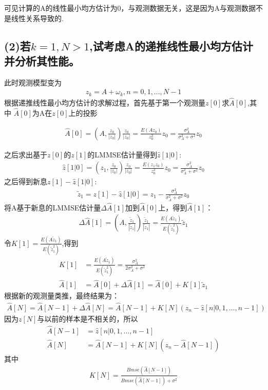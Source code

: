 \documentclass[fontset=windows]{article}
\numberwithin{figure}{section}
\begin{document}
可见计算的A的线性最小均方估计为0，与观测数据无关，这是因为A与观测数据不是线性关系导致的.

\subsection*{(2)若\(k=1,N>1\),试考虑A的递推线性最小均方估计并分析其性能。}

此时观测模型变为
\begin{align*}
	z_k=A+\omega_k,n=0,1,\dots,N-1
\end{align*}
根据递推线性最小均方估计的求解过程，首先基于第一个观测量\(z[0]\)求\(\hat{A}[0]\),其中
\(\hat{A}[0]\)为A在\(z[0]\)上的投影

\begin{align*}
	\hat{A}[0]=\left( A,\frac{z_0}{|z_0|}\right)\frac{z_0}{|z_0|}=\frac{E(Az_0)}{z_0^2}z_0
	=\frac{\sigma_A^2}{\sigma_A^2+\sigma^2}z_0
\end{align*}

之后求出基于\(z[0]\)的\(z[1]\)的LMMSE估计量得到\(\hat{z}[1|0]\):
\begin{align*}
	\hat{z}[1|0]=\left( z_1,\frac{z_0}{|z_0|}\right)\frac{z_0}{|z_0|}=\frac{E(z_1 z_0)}{z_0^2}z_0
	=\frac{\sigma_A^2}{\sigma_A^2+\sigma^2}z_0
\end{align*}
之后得到新息\(z[1]-\hat{z}[1|0]\):
\begin{align*}
	\widetilde{z}_1=z[1]-\hat{z}[1|0]=z_1-\frac{\sigma_A^2}{\sigma_A^2+\sigma^2}z_0
\end{align*}
将A基于新息的LMMSE估计量\(\Delta\hat{A}[1]\)加到\(\hat{A}[0]\)上，得到\(\hat{A}[1]\)：
\begin{align*}
	\Delta\hat{A}[1]=\left(A,\frac{\widetilde{z}_1}{|\widetilde{z}_1|}\right)
	\frac{\widetilde{z}_1}{|\widetilde{z}_1|}=\frac{E(A\widetilde{z}_1)}{E(\widetilde{z}_1^2)}\widetilde{z}_1
\end{align*}
令\(K[1]=\frac{E(A\widetilde{z}_1)}{E(\widetilde{z}_1^2)}\),得到
\begin{align*}
	K[1]       & =\frac{E(A\widetilde{z}_1)}{E(\widetilde{z}_1^2)}=\frac{\sigma_A^2}{2\sigma_A^2+\sigma^2} \\
	\hat{A}[1] & =\hat{A}[0]+\Delta\hat{A}[1]=\hat{A}[0]+K[1]\widetilde{z}_1
\end{align*}
根据新的观测量类推，最终结果为：
\begin{align*}
	\hat{A}[N]=\hat{A}[N-1]+\Delta\hat{A}[N]=\hat{A}[N-1]+K[N](z_n-\hat{z}[n|0,1,\dots,n-1])
\end{align*}
因为\(z[N]\)与以前的样本是不相关的，所以
\begin{align*}
	\hat{A}[N-1] & =\hat{z}[n|0,1,\dots,n-1]            \\
	\hat{A}[N]   & =\hat{A}[N-1]+K[N](z_n-\hat{A}[N-1])
\end{align*}
其中
\begin{align*}
	K[N]=\frac{Bmse(\hat{A}[N-1])}{Bmse(\hat{A}[N-1])+\sigma^2}
\end{align*}
\end{document}
